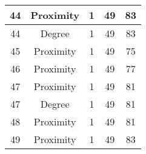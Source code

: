 \documentclass[results.tex]{subfiles}
\begin{document}
\begin{center}
\begin{tabular}{| c || c | c | c | c |}
    \hline
    44 & Proximity & 1 & 49 & 83 \\ 
    \hline
    44 & Degree & 1 & 49 & 83 \\ 
    \hline
    45 & Proximity & 1 & 49 & 75 \\ 
    \hline
    46 & Proximity & 1 & 49 & 77 \\ 
    \hline
    47 & Proximity & 1 & 49 & 81 \\ 
    \hline
    47 & Degree & 1 & 49 & 81 \\ 
    \hline
    48 & Proximity & 1 & 49 & 81 \\ 
    \hline
    49 & Proximity & 1 & 49 & 83 \\ 
    \hline   \end{tabular}
\end{center}
\end{document}
